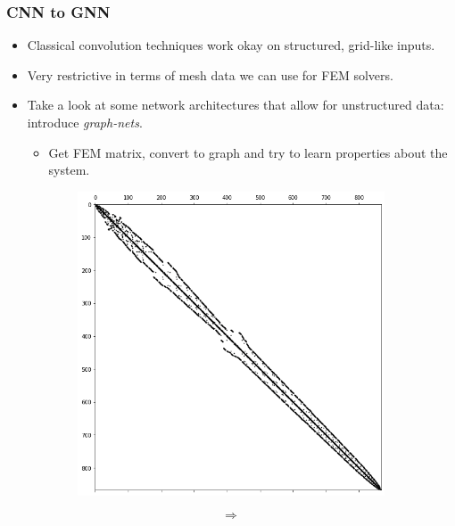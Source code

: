 \documentclass[handout]{beamer}
\begin{document}
\begin{frame}
  \frametitle{CNN to GNN}
  \begin{itemize}
  \item Classical convolution techniques work okay on structured, grid-like inputs.
  \item Very restrictive in terms of mesh data we can use for FEM solvers.
  \item Take a look at some network architectures that allow for unstructured data: introduce \textit{graph-nets}.
    \begin{itemize}
      \item Get FEM matrix, convert to graph and try to learn properties about the system.
    \end{itemize}
  \end{itemize}
    \begin{figure}[h]
  \begin{subfigure}{.4\textwidth}
    \includegraphics[width=\textwidth]{figures/sparse.png}
  \end{subfigure}
  \begin{subfigure}{.08\textwidth}
    \[ \Longrightarrow \]
  \end{subfigure}
  \begin{subfigure}{.40\textwidth}

\end{subfigure}
\end{figure}
\end{frame}
\end{document}
